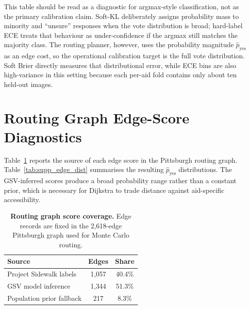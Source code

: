 \documentclass[conference]{IEEEtran}
\begin{document}
This table should be read as a diagnostic for argmax-style classification, not as the primary calibration claim. Soft-KL deliberately assigns probability mass to minority and ``unsure'' responses when the vote distribution is broad; hard-label ECE treats that behaviour as under-confidence if the argmax still matches the majority class. The routing planner, however, uses the probability magnitude $\hat{p}_\mathrm{yes}$ as an edge cost, so the operational calibration target is the full vote distribution. Soft Brier directly measures that distributional error, while ECE bins are also high-variance in this setting because each per-aid fold contains only about ten held-out images.

\FloatBarrier
\section{Routing Graph Edge-Score Diagnostics}
\label{sec:supp_edge_diag}

Table~\ref{tab:supp_edge_sources} reports the source of each edge score in the Pittsburgh routing graph. Table~\ref{tab:supp_edge_dist} summarises the resulting $\hat{p}_\mathrm{yes}$ distributions. The GSV-inferred scores produce a broad probability range rather than a constant prior, which is necessary for Dijkstra to trade distance against aid-specific accessibility.

\begin{table}[!t]
\caption{\textbf{Routing graph score coverage.} Edge records are fixed in the 2,618-edge Pittsburgh graph used for Monte Carlo routing.}
\label{tab:supp_edge_sources}
\centering\scriptsize
\setlength{\tabcolsep}{6pt}
\begin{tabular}{@{}lcc@{}}
\toprule
\textbf{Source} & \textbf{Edges} & \textbf{Share} \\
\midrule
Project Sidewalk labels & 1,057 & 40.4\% \\
GSV model inference & 1,344 & 51.3\% \\
Population prior fallback & 217 & 8.3\% \\
\bottomrule
\end{tabular}
\end{table}
\end{document}
